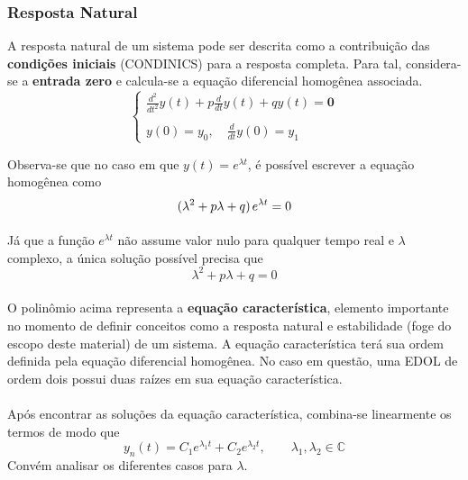 \documentclass{article}
\numberwithin{equation}{section}
\begin{document}
    \subsubsection{Resposta Natural}
    \label{subsubsec:natural}
    A resposta natural de um sistema pode ser descrita como a contribuição das \textbf{condições iniciais} (CONDINICS) para a resposta completa. Para tal, considera-se a \textbf{entrada zero} e calcula-se a equação diferencial homogênea associada.
    \begin{equation*}
        \begin{cases}
            \displaystyle\frac{d^2}{dt^2}y(t)+p\frac{d}{dt}y(t)+qy(t)=\textbf{0}\\ \\
            \displaystyle{y(0)=y_{0}, \quad \frac{d}{dt}y(0)=y_{1}}
        \end{cases}
    \end{equation*}

    Observa-se que no caso em que $y(t) = e^{\lambda t}$, é possível escrever a equação homogênea como
    \begin{equation*}
        (\lambda^{2}+p\lambda+q)\hspace{0.05cm} e^{\lambda t} = 0
    \end{equation*}
    \paragraph{}Já que a função $e^{\lambda t}$ não assume valor nulo para qualquer tempo real e $\lambda$ complexo, a única solução possível precisa que
    \begin{equation}
        \lambda^{2}+p\lambda+q=0
    \end{equation}
    \paragraph{}O polinômio acima representa a \textbf{equação característica}, elemento importante no momento de definir conceitos como a resposta natural e estabilidade (foge do escopo deste material) de um sistema. A equação característica terá sua ordem definida pela equação diferencial homogênea. No caso em questão, uma EDOL de ordem dois possui duas raízes em sua equação característica.
    \paragraph{}Após encontrar as soluções da equação característica, combina-se linearmente os termos de modo que
    \begin{equation*}
        \displaystyle y_{n}(t)=C_{1}e^{\lambda_{1}t}+C_{2}e^{\lambda_{2}t}, \qquad \lambda_{1},\lambda_{2} \in \mathbb{C}
    \end{equation*}
    Convém analisar os diferentes casos para $\lambda$.
\end{document}
